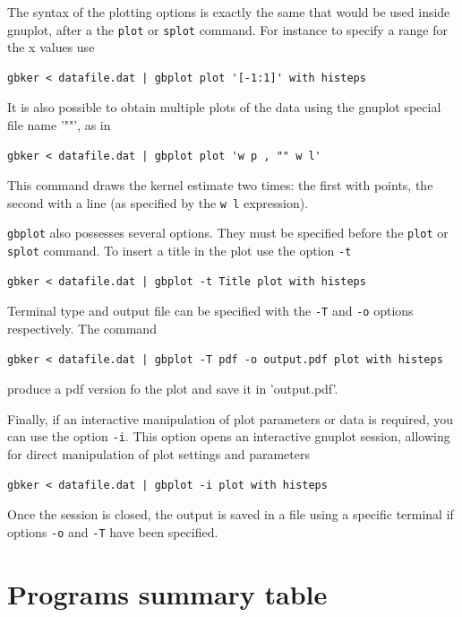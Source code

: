 \documentclass[11pt]{article}
\begin{document}
The syntax of the plotting options is exactly the same that would be
used inside gnuplot, after a the \texttt{plot} or \texttt{splot} command. For
instance to specify a range for the x values use

\begin{verbatim}
gbker < datafile.dat | gbplot plot '[-1:1]' with histeps
\end{verbatim}

It is also possible to obtain multiple plots of the data using the
gnuplot special file name '""', as in

\begin{verbatim}
gbker < datafile.dat | gbplot plot 'w p , "" w l'
\end{verbatim}

This command draws the kernel estimate two times: the first with
points, the second with a line (as specified by the \verb~w l~ expression).

\verb~gbplot~ also possesses several options. They must be specified before
the \texttt{plot} or \texttt{splot} command. To insert a title in the plot use the
option \verb~-t~

\begin{verbatim}
gbker < datafile.dat | gbplot -t Title plot with histeps
\end{verbatim}

Terminal type and output file can be specified with the \verb~-T~ and \verb~-o~
options respectively. The command

\begin{verbatim}
gbker < datafile.dat | gbplot -T pdf -o output.pdf plot with histeps
\end{verbatim}

produce a pdf version fo the plot and save it in 'output.pdf'.

Finally, if an interactive manipulation of plot parameters or data is
required, you can use the option \verb~-i~. This option opens an
interactive gnuplot session, allowing for direct manipulation of plot
settings and parameters

\begin{verbatim}
gbker < datafile.dat | gbplot -i plot with histeps
\end{verbatim}

Once the session is closed, the output is saved in a file using a
specific terminal if options \verb~-o~ and \verb~-T~ have been specified.

\section{Programs summary table}
\label{sec-6}
\end{document}
